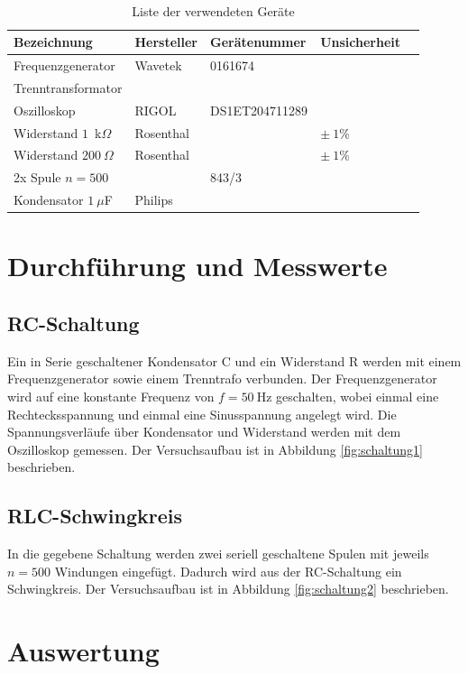 \documentclass{article}
\begin{document}
\begin{table}[H]
\caption{Liste der verwendeten Geräte}

~

\begin{tabular}{l|llll}
Bezeichnung & Hersteller & Gerätenummer & Unsicherheit \\
\hline
Frequenzgenerator & Wavetek & 0161674  \\
Trenntransformator & \\
Oszilloskop & RIGOL &DS1ET204711289 \\
Widerstand $1$~k$\Omega$ & Rosenthal & & $\pm~1\%$ \\
Widerstand $200~\Omega$ & Rosenthal & & $\pm~1\%$ \\
2x Spule $n=500$ & & 843/3 \\
Kondensator $1~\mu$F & Philips
\end{tabular}

\end{table}




\section{Durchführung und Messwerte}

\subsection{RC-Schaltung}

Ein in Serie geschaltener Kondensator C und ein Widerstand R werden mit einem Frequenzgenerator sowie einem Trenntrafo verbunden. Der Frequenzgenerator wird auf eine konstante Frequenz von $f=50~$Hz geschalten, wobei einmal eine Rechtecksspannung und einmal eine Sinusspannung angelegt wird. Die Spannungsverläufe über Kondensator und Widerstand werden mit dem Oszilloskop gemessen. Der Versuchsaufbau ist in Abbildung \ref{fig:schaltung1} beschrieben.


\subsection{RLC-Schwingkreis}

In die gegebene Schaltung werden zwei seriell geschaltene Spulen mit jeweils $n=500$ Windungen eingefügt. Dadurch wird aus der RC-Schaltung ein Schwingkreis. Der Versuchsaufbau ist in Abbildung \ref{fig:schaltung2} beschrieben.

\section{Auswertung}
\end{document}
